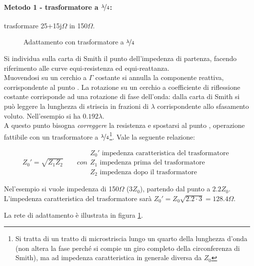 \paragraph{Metodo 1 - trasformatore a $\nicefrac{\lambda}{4}$:} trasformare 25+15j$\Omega$ in 150$\Omega$.

\begin{figure}[hbt]
	\centering
	\hfill
	\caption{Adattamento con trasformatore a $\nicefrac{\lambda}{4}$}
	\label{fig:adattamento-trasformatore}
\end{figure}

Si individua sulla carta di Smith il punto  dell'impedenza di partenza, facendo riferimento alle curve equi-resistenza ed equi-reattanza.
\\
Muovendosi su un cerchio a $\Gamma$ costante si annulla la componente reattiva, corrispondente al punto .
La rotazione su un cerchio a coefficiente di riflessione costante corrisponde ad una rotazione di fase dell'onda: dalla carta di Smith si può leggere la lunghezza di striscia in frazioni di $\lambda$ corrispondente allo sfasamento voluto. Nell'esempio si ha $0.192\lambda$.
\\
A questo punto bisogna \textit{correggere} la resistenza e spostarsi al punto , operazione fattibile con un trasformatore a $\nicefrac{\lambda}{4}$\footnote{Si tratta di un tratto di microstriscia lungo un quarto della lunghezza d'onda (non altera la fase perché si compie un giro completo della circonferenza di Smith), ma ad impedenza caratteristica in generale diversa da $Z_0$}. Vale la seguente relazione:

\[
Z_0' = \sqrt{Z_1 Z_2}
\qquad
con
\begin{array}{l}
Z_0' \mbox{ impedenza caratteristica del trasformatore}
\\
Z_1 \mbox{ impedenza prima del trasformatore}
\\
Z_2 \mbox{ impedenza dopo il trasformatore}
\end{array}
\]

Nel'esempio si vuole impedenza di 150$\Omega$ ($3Z_0$), partendo dal punto  a $2.2Z_0$.
L'impedenza caratteristica del trasformatore sarà $Z_0' = Z_0\sqrt{2.2\cdot3} = 128.4\Omega$.

La rete di adattamento è illustrata in figura \ref{fig:adattamento-trasformatore}.

